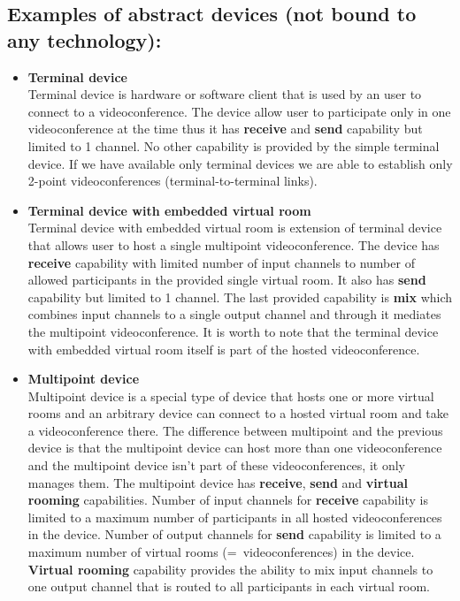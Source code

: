 \documentclass[a4paper]{report}
\begin{document}
\subsection*{Examples of abstract devices (not bound to any technology):}
\begin{itemize}
\item \textbf{Terminal device} \\
  Terminal device is hardware or software client that is used by an user to 
  connect to a videoconference. The device allow user to participate only in
  one videoconference at the time thus it has \textbf{receive} and 
  \textbf{send} capability but limited to 1 channel. No other capability is 
  provided by the simple terminal device. If we have available only terminal 
  devices we are able to establish only 2-point videoconferences 
  (terminal-to-terminal links).

\item \textbf{Terminal device with embedded virtual room} \\
  Terminal device with embedded virtual room is extension of terminal device 
  that allows user to host a single multipoint videoconference. The device has 
  \textbf{receive} capability with limited number of input channels to number 
  of allowed participants in the provided single virtual room. It also has 
  \textbf{send} capability but limited to 1 channel. The last provided 
  capability is \textbf{mix} which combines input channels to a single output 
  channel and through it mediates the multipoint videoconference. It is worth 
  to note that the terminal device with embedded virtual room itself is part of 
  the hosted videoconference.

\item \textbf{Multipoint device} \\
  Multipoint device is a special type of device that hosts one or more virtual 
  rooms and an arbitrary device can connect to a hosted virtual room and take 
  a videoconference there. The difference between multipoint and the previous 
  device is that the multipoint device can host more than one videoconference 
  and the multipoint device isn't part of these videoconferences, it only 
  manages them. The multipoint device has \textbf{receive}, \textbf{send} and 
  \textbf{virtual rooming} capabilities. Number of input channels for 
  \textbf{receive} capability is limited to a maximum number of participants 
  in all hosted videoconferences in the device. Number of output channels for 
  \textbf{send} capability is limited to a maximum number of virtual rooms 
  (=~videoconferences) in the device. \textbf{Virtual rooming} capability 
  provides the ability to mix input channels to one output channel 
  that is routed to all participants in each virtual room.


\end{itemize}
\end{document}
